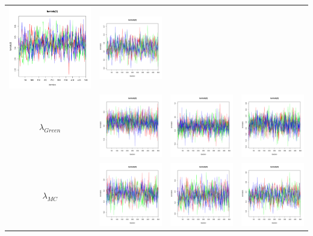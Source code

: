 \documentclass[letter,12pt]{article}
\begin{document}
\begin{table}
\begin{tabular}{cccc}
                        \includegraphics[width=.15\columnwidth]{../graphs/traceplots/2015d3vbar_3.pdf} &
                         \includegraphics[width=.15\columnwidth]{../graphs/traceplots/2015d3wbar_3.pdf} \\
    $\lambda_{Green}$  & \includegraphics[width=.15\columnwidth]{../graphs/traceplots/2015d3v_4.pdf} &
                        \includegraphics[width=.15\columnwidth]{../graphs/traceplots/2015d3vbar_4.pdf} &
                         \includegraphics[width=.15\columnwidth]{../graphs/traceplots/2015d3wbar_4.pdf} \\
    $\lambda_{MC}$    & \includegraphics[width=.15\columnwidth]{../graphs/traceplots/2015d3v_5.pdf} &
                        \includegraphics[width=.15\columnwidth]{../graphs/traceplots/2015d3vbar_5.pdf} &
                         \includegraphics[width=.15\columnwidth]{../graphs/traceplots/2015d3wbar_5.pdf} \\

\end{tabular}
\end{table}
\end{document}
